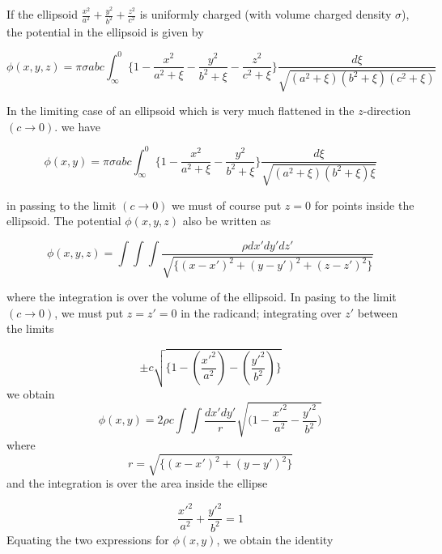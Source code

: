 If the ellipsoid $\frac{x^{2}}{a^{2}}+\frac{y^{2}}{b^{2}}+\frac{z^{2}}{c^{2}}$ is uniformly charged (with volume
charged density $\sigma$), the potential in the ellipsoid is given by


\begin{equation}
\phi(x,y,z) = \pi\sigma abc\int_{\infty}^{0} \Big\{ 1-\frac{x^{2}}{a^{2}+\xi} - \frac{y^{2}}{b^{2}+\xi} - \frac{z^{2}}{c^{2}+\xi} \Big\} \frac{d\xi}{\sqrt{(a^{2}+\xi)(b^{2}+\xi)(c^{2}+\xi)}}
\end{equation}
%

In the limiting case of an ellipsoid which is very much flattened in the $z$-direction $(c\rightarrow0)$. we have

\begin{equation}
\phi(x,y) = \pi\sigma abc\int_{\infty}^{0} \Big\{ 1-\frac{x^{2}}{a^{2}+\xi} - \frac{y^{2}}{b^{2}+\xi} \Big\} \frac{d\xi}{\sqrt{(a^{2}+\xi)(b^{2}+\xi)\xi}}
\end{equation}

in passing to the limit $(c\rightarrow0)$ we must of course put $z=0$ for points inside the ellipsoid. The potential $\phi(x,y,z)$ also be written as

\begin{equation}
\phi(x,y,z) = \int\int\int\frac{\rho dx'dy'dz'}{\sqrt{\{(x-x')^{2}+(y-y')^{2}+(z-z')^{2}\}}}
\end{equation}

where the integration is over the volume of the ellipsoid. In pasing to the limit $(c\rightarrow0)$, we must put $z=z'=0$ in the radicand; integrating over $z'$ between the limits

\begin{equation}
\pm c \sqrt{\{1-(\frac{x'^{2}}{a^{2}})-(\frac{y'^{2}}{b^{2}})\}}
\end{equation}
we obtain
\begin{equation}
\phi (x,y) = 2\rho c \int\int\frac{dx'dy'}{r}\sqrt{\Big(1-\frac{x'^{2}}{a^{2}} - \frac{y'^{2}}{b^{2}} \Big)}
\end{equation}
where
\begin{equation}
r = \sqrt{\{(x-x')^{2}+(y-y')^{2}\}}
\end{equation}
and the integration is over the area inside the ellipse

\begin{equation}
\frac{x'^{2}}{a^{2}} + \frac{y'^{2}}{b^{2}} = 1
\end{equation}
Equating the two expressions for $\phi(x,y)$, we obtain the identity

